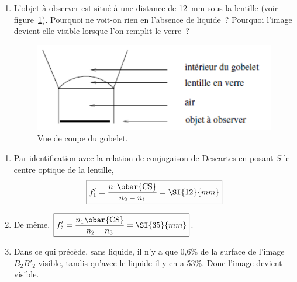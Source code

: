 \documentclass[a4paper, 11pt, garamond, oneside]{book}
\begin{document}
{\begin{enumerate}
		\item L'objet à observer est situé à une distance de \SI{12}{mm} sous la
		      lentille (voir figure~\ref{fig:coupe}). Pourquoi ne voit-on rien en
		      l'absence de liquide~? Pourquoi l'image devient-elle visible lorsque
		      l'on remplit le verre~?
		      \begin{figure}[htbp]
			      \centering
			      \includegraphics[width=.45\linewidth]{fig5}
			      \caption{Vue de coupe du gobelet.}
			      \label{fig:coupe}
		      \end{figure}
	\end{enumerate}
}{
	\begin{enumerate}
		\item Par identification avec la relation de conjugaison de Descartes en
		      posant $S$ le centre optique de la lentille,
		      \[
			      \boxed{f'_1=\frac{n_1\obar{\rm CS}}{n_2-n_1}=\SI{12}{mm}}
		      \]
		\item De même, $\boxed{f'_2=\frac{n_1\obar{\rm CS}}{n_2-n_3}=\SI{35}{mm}}$.
		\item Dans ce qui précède, sans liquide, il n'y a que 0,6\% de la surface de
		      l'image $B_2B'_2$ visible, tandis qu'avec le liquide il y en a 53\%. Donc
		      l'image devient visible.
	\end{enumerate}
}
\end{document}
